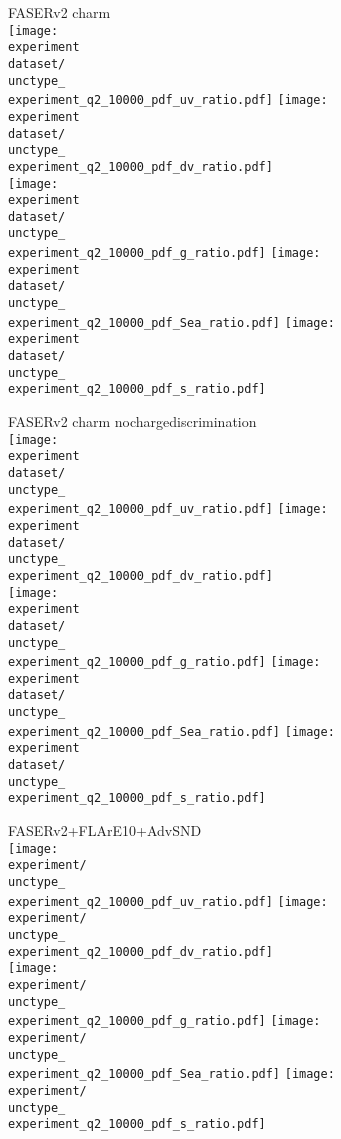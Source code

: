 \documentclass{article}
\newcommand{\figw}{70mm}
\newcommand{\experiment}{FASERv2}
\newcommand{\unctype}{fred05}
\begin{document}
\newpage

FASERv2 charm\\
\renewcommand{\dataset}{_charm}
\texttt{[image: \\experiment\\dataset/\\unctype\_\\experiment\_q2\_10000\_pdf\_uv\_ratio.pdf]}
\texttt{[image: \\experiment\\dataset/\\unctype\_\\experiment\_q2\_10000\_pdf\_dv\_ratio.pdf]}\\
\texttt{[image: \\experiment\\dataset/\\unctype\_\\experiment\_q2\_10000\_pdf\_g\_ratio.pdf]}
\texttt{[image: \\experiment\\dataset/\\unctype\_\\experiment\_q2\_10000\_pdf\_Sea\_ratio.pdf]}
\texttt{[image: \\experiment\\dataset/\\unctype\_\\experiment\_q2\_10000\_pdf\_s\_ratio.pdf]}

\newpage

FASERv2 charm nochargediscrimination\\
\renewcommand{\dataset}{_charm_nochargediscrimination}
\texttt{[image: \\experiment\\dataset/\\unctype\_\\experiment\_q2\_10000\_pdf\_uv\_ratio.pdf]}
\texttt{[image: \\experiment\\dataset/\\unctype\_\\experiment\_q2\_10000\_pdf\_dv\_ratio.pdf]}\\
\texttt{[image: \\experiment\\dataset/\\unctype\_\\experiment\_q2\_10000\_pdf\_g\_ratio.pdf]}
\texttt{[image: \\experiment\\dataset/\\unctype\_\\experiment\_q2\_10000\_pdf\_Sea\_ratio.pdf]}
\texttt{[image: \\experiment\\dataset/\\unctype\_\\experiment\_q2\_10000\_pdf\_s\_ratio.pdf]}

\newpage

FASERv2+FLArE10+AdvSND\\
\renewcommand{\experiment}{FPF}
\texttt{[image: \\experiment/\\unctype\_\\experiment\_q2\_10000\_pdf\_uv\_ratio.pdf]}
\texttt{[image: \\experiment/\\unctype\_\\experiment\_q2\_10000\_pdf\_dv\_ratio.pdf]}\\
\texttt{[image: \\experiment/\\unctype\_\\experiment\_q2\_10000\_pdf\_g\_ratio.pdf]}
\texttt{[image: \\experiment/\\unctype\_\\experiment\_q2\_10000\_pdf\_Sea\_ratio.pdf]}
\texttt{[image: \\experiment/\\unctype\_\\experiment\_q2\_10000\_pdf\_s\_ratio.pdf]}
\end{document}
